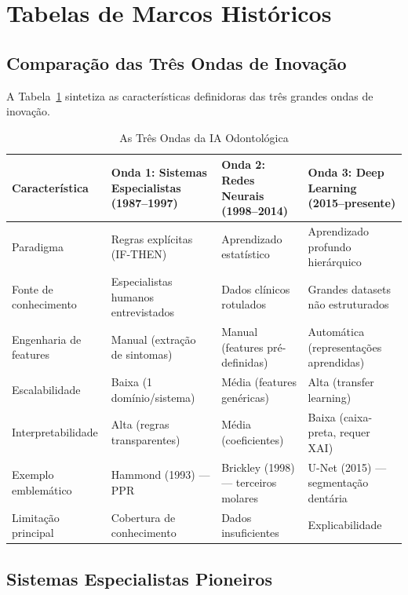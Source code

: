 \section{Tabelas de Marcos Históricos}

\subsection{Comparação das Três Ondas de Inovação}

A Tabela~\ref{tab:tres-ondas} sintetiza as características definidoras das três grandes ondas de inovação.

\begin{table}[H]
  \centering
  \caption{As Três Ondas da IA Odontológica}
  \label{tab:tres-ondas}
  \begin{tabularx}{\textwidth}{lXXX}
    \toprule
    \textbf{Característica} & \textbf{Onda 1: Sistemas Especialistas (1987--1997)} & \textbf{Onda 2: Redes Neurais (1998--2014)} & \textbf{Onda 3: Deep Learning (2015--presente)} \\
    \midrule
    Paradigma & Regras explícitas (IF-THEN) & Aprendizado estatístico & Aprendizado profundo hierárquico \\
    Fonte de conhecimento & Especialistas humanos entrevistados & Dados clínicos rotulados & Grandes datasets não estruturados \\
    Engenharia de features & Manual (extração de sintomas) & Manual (features pré-definidas) & Automática (representações aprendidas) \\
    Escalabilidade & Baixa (1 domínio/sistema) & Média (features genéricas) & Alta (transfer learning) \\
    Interpretabilidade & Alta (regras transparentes) & Média (coeficientes) & Baixa (caixa-preta, requer XAI) \\
    Exemplo emblemático & Hammond (1993) — PPR & Brickley (1998) — terceiros molares & U-Net (2015) — segmentação dentária \\
    Limitação principal & Cobertura de conhecimento & Dados insuficientes & Explicabilidade \\
    \bottomrule
  \end{tabularx}
\end{table}

\subsection{Sistemas Especialistas Pioneiros}

